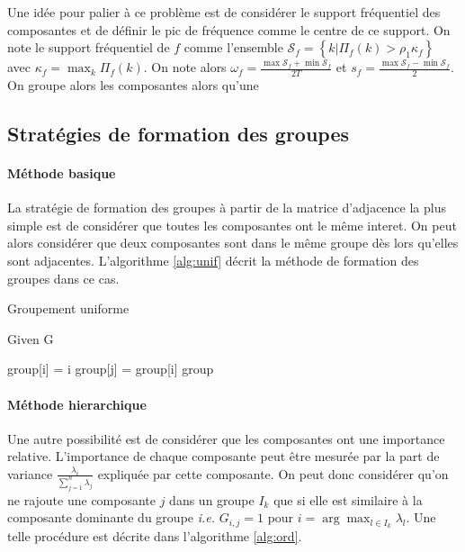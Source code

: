 \documentclass{gretsi}
\begin{document}
    Une idée pour palier à ce problème est de considérer le support fréquentiel des composantes et de définir le pic de fréquence comme le centre de ce support. On note le support fréquentiel de $f$ comme l'ensemble $\mathcal S_f = \left \{ k | \Pi_f(k) > \rho_1 \kappa_f \right \}$ avec $\kappa_f = \max_k \Pi_f(k)$. On note alors $\omega_f = \frac{\max \mathcal S_f + \min \mathcal S_f }{2 T}$ et $s_f = \frac{\max \mathcal S_f - \min \mathcal S_f }{2}$. On groupe alors les composantes  alors qu'une 



\subsection{Stratégies de formation des groupes}
\label{sub:clust}


\paragraph{Méthode basique}
La stratégie de formation des groupes à partir de la matrice d'adjacence la plus simple est de considérer que toutes les composantes ont le même interet. On peut alors considérer que deux composantes sont dans le même groupe dès lors qu'elles sont adjacentes. L'algorithme \ref{alg:unif} décrit la méthode de formation des groupes dans ce cas.\\

\begin{algorithm}
\caption{Groupement uniforme}\label{alg:unif}
Given G
\begin{algorithmic}[1]
\State group[i] = i
\EndFor
{}
 group[j] = group[i]
\EndIf
\EndFor
\EndFor
\State \Return group
\end{algorithmic}
\end{algorithm}


\paragraph{Méthode hierarchique}
Une autre possibilité est de considérer que les composantes ont une importance relative. L'importance de chaque composante peut être mesurée par la part de variance $\frac{\lambda_i}{\sum_{j=1}^n \lambda_j}$ expliquée par cette composante. On peut donc considérer qu'on ne rajoute une composante $j$ dans un groupe $I_k$ que si elle est similaire à la composante dominante du groupe \emph{ i.e. } $G_{i, j} = 1$ pour $i = \arg\max_{l \in I_k} \lambda_l$. Une telle procédure est décrite dans l'algorithme \ref{alg:ord}.
\end{document}
